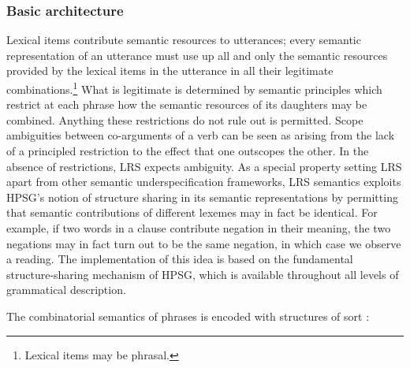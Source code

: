 \documentclass[output=paper
 	        ,biblatex
                ,babelshorthands
                ,newtxmath
                ,draftmode
                ,colorlinks, citecolor=brown
]{langscibook}
\begin{document}
\subsubsection{Basic architecture}
\label{semantics:sec-basic-architecture}

Lexical items contribute semantic resources to utterances; every semantic representation of an utterance must use up all and only the semantic resources provided by the lexical items in the utterance in all their legitimate combinations.\footnote{Lexical items may be phrasal.} What is legitimate is determined by semantic principles which restrict at each phrase how the semantic resources of its daughters may be combined. Anything these restrictions do not rule out is permitted. Scope ambiguities between co-arguments of a verb can be seen as arising from the lack of a principled restriction to the effect that one outscopes the other. In the absence of restrictions, LRS expects ambiguity. As a special property setting LRS apart from other semantic underspecification frameworks, LRS semantics exploits HPSG's notion of structure sharing in its semantic representations by permitting that semantic contributions of different lexemes may in fact be identical. For example, if two words in a clause contribute negation in their meaning, the two negations may in fact turn out to be the same negation, in which case we observe a  reading. The implementation of this idea is based on the fundamental structure-sharing mechanism of HPSG, which is available throughout all levels of grammatical description.

The combinatorial semantics of phrases is encoded with structures of sort :


\begin{exe}
  \ex\label{lrs-str}
\end{exe}
\end{document}
